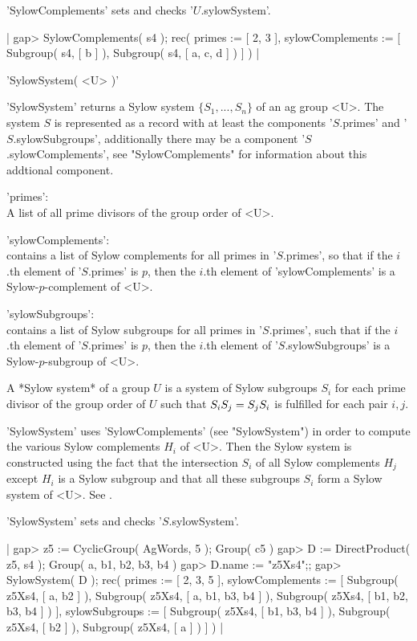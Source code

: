 'SylowComplements'  sets and checks '$U$.sylowSystem'.

|    gap> SylowComplements( s4 );
    rec(
      primes := [ 2, 3 ],
      sylowComplements :=
       [ Subgroup( s4, [ b ] ), Subgroup( s4, [ a, c, d ] ) ] ) |



'SylowSystem( <U> )'

'SylowSystem' returns a Sylow  system $\{ S_1, ...  ,  S_n  \}$  of an ag
group  <U>.  The system $S$ is represented as a record with at  least the
components '$S$.primes' and '$S$.sylowSubgroups', additionally  there may
be   a  component  '$S$.sylowComplements',  see   "SylowComplements"  for
information about this addtional component.

'primes': \\
        A list of all prime divisors of the group order of <U>.

'sylowComplements': \\
        contains a    list of Sylow   complements for  all   primes  in
        '$S$.primes',   so    that    if   the    $i$.th    element  of
        '$S$.primes' is    $p$,    then   the    $i$.th    element   of
        'sylowComplements' is a Sylow-$p$-complement of <U>.

'sylowSubgroups': \\
        contains  a  list  of  Sylow   subgroups   for all   primes  in
        '$S$.primes',   such     that  if   the   $i$.th   element   of
        '$S$.primes'   is    $p$,   then    the  $i$.th    element   of
        '$S$.sylowSubgroups' is a Sylow-$p$-subgroup of <U>.

A  *Sylow system* of a group $U$ is a system of Sylow subgroups $S_i$ for
each  prime divisor of the group order of $U$ such that $S_i \* S_j = S_j
\* S_i$ is fulfilled for each pair $i,j$.

'SylowSystem' uses  'SylowComplements' (see "SylowSystem")  in  order  to
compute the  various Sylow  complements  $H_i$  of <U>.   Then the  Sylow
system is constructed using the  fact  that the intersection $S_i$ of all
Sylow  complements $H_j$ except  $H_i$ is  a Sylow subgroup and that  all
these subgroups $S_i$ form a Sylow system of <U>.  See \cite{Gla87}.

'SylowSystem'  sets and checks '$S$.sylowSystem'.

|    gap> z5 := CyclicGroup( AgWords, 5 );
    Group( c5 )
    gap> D := DirectProduct( z5, s4 );
    Group( a, b1, b2, b3, b4 )
    gap> D.name := "z5Xs4";;
    gap> SylowSystem( D );
    rec(
      primes := [ 2, 3, 5 ],
      sylowComplements :=
       [ Subgroup( z5Xs4, [ a, b2 ] ), Subgroup( z5Xs4, [ a, b1, b3, b4
             ] ), Subgroup( z5Xs4, [ b1, b2, b3, b4 ] ) ],
      sylowSubgroups :=
       [ Subgroup( z5Xs4, [ b1, b3, b4 ] ), Subgroup( z5Xs4, [ b2 ] ),
          Subgroup( z5Xs4, [ a ] ) ] ) |

